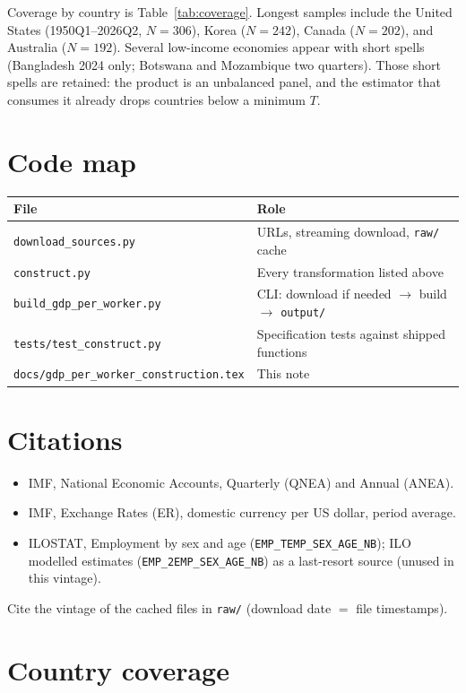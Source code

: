 \documentclass[11pt]{article}
\begin{document}
Coverage by country is Table~\ref{tab:coverage}. Longest samples include the
United States (1950Q1--2026Q2, $N=306$), Korea ($N=242$), Canada ($N=202$),
and Australia ($N=192$). Several low-income economies appear with short
spells (Bangladesh 2024 only; Botswana and Mozambique two quarters). Those
short spells are retained: the product is an unbalanced panel, and the
estimator that consumes it already drops countries below a minimum $T$.

\section{Code map}

\begin{tabular}{ll}
\toprule
File & Role \\
\midrule
\texttt{download\_sources.py} & URLs, streaming download, \texttt{raw/} cache \\
\texttt{construct.py} & Every transformation listed above \\
\texttt{build\_gdp\_per\_worker.py} & CLI: download if needed $\to$ build $\to$ \texttt{output/} \\
\texttt{tests/test\_construct.py} & Specification tests against shipped functions \\
\texttt{docs/gdp\_per\_worker\_construction.tex} & This note \\
\bottomrule
\end{tabular}

\section{Citations}

\begin{itemize}
\item IMF, National Economic Accounts, Quarterly (QNEA) and Annual (ANEA).
\item IMF, Exchange Rates (ER), domestic currency per US dollar, period average.
\item ILOSTAT, Employment by sex and age (\texttt{EMP\_TEMP\_SEX\_AGE\_NB});
ILO modelled estimates (\texttt{EMP\_2EMP\_SEX\_AGE\_NB}) as a last-resort
source (unused in this vintage).
\end{itemize}

Cite the vintage of the cached files in \texttt{raw/} (download date $=$ file
timestamps).

\clearpage
\appendix
\section{Country coverage}

\end{document}
